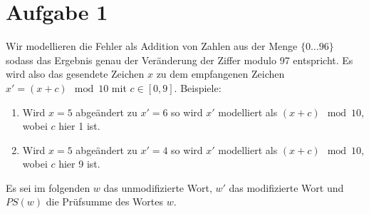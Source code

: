 

\section*{Aufgabe 1}
Wir modellieren die Fehler als Addition von Zahlen aus der Menge $\lbrace 0 \ldots 96\rbrace$ sodass das Ergebnis genau der Veränderung der Ziffer modulo 97 entspricht.
Es wird also das gesendete Zeichen $x$ zu dem empfangenen Zeichen $x' = (x + c) \mod 10$ mit $c\in[0, 9]$.
Beispiele:
\begin{enumerate}
	\item Wird $x = 5$ abgeändert zu $x' = 6$ so wird $x'$  modelliert als $(x + c) \mod 10$, wobei $c$ hier 1 ist.
	\item Wird $x = 5$ abgeändert zu $x' = 4$ so wird $x'$  modelliert als $(x + c) \mod 10$, wobei $c$ hier 9 ist.
\end{enumerate}

Es sei im folgenden $w$ das unmodifizierte Wort, $w'$ das modifizierte Wort und $PS(w)$ die Prüfsumme des Wortes $w$.

